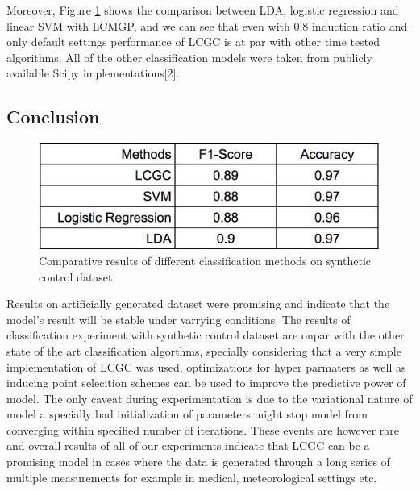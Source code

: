 Moreover, Figure \ref{fig:lcpc_classification_results} shows the comparison between LDA, logistic regression and linear SVM with LCMGP, and we can see that even with 0.8 induction ratio and only default settings performance of LCGC is at par with other time tested algorithms. All of the other classification models were taken from publicly available Scipy implementations[2].
\subsection{Conclusion}
\begin{figure}
    \centering
    \includegraphics[scale=0.45]{thesis/images/LCGC_classification_results.png}
    \caption{Comparative results of different classification methods on synthetic control dataset }
    \label{fig:lcpc_classification_results}
\end{figure}

Results on artificially generated dataset were promising and indicate that the model's result will be stable under varrying conditions. The results of classification experiment with synthetic control dataset are onpar with the other state of the art classification algorthms, specially considering that a very simple implementation of LCGC was used, optimizations for hyper parmaters as well as inducing point selecition schemes can be used to improve the predictive power of model. The only caveat during experimentation is due to the variational nature of model a specially bad initialization of parameters might stop model from converging within specified number of iterations. These events are however rare and overall results of all of our experiments indicate that LCGC can be a promising model in cases  where the data is generated through a long series of multiple measurements for example in medical, meteorological settings etc.
